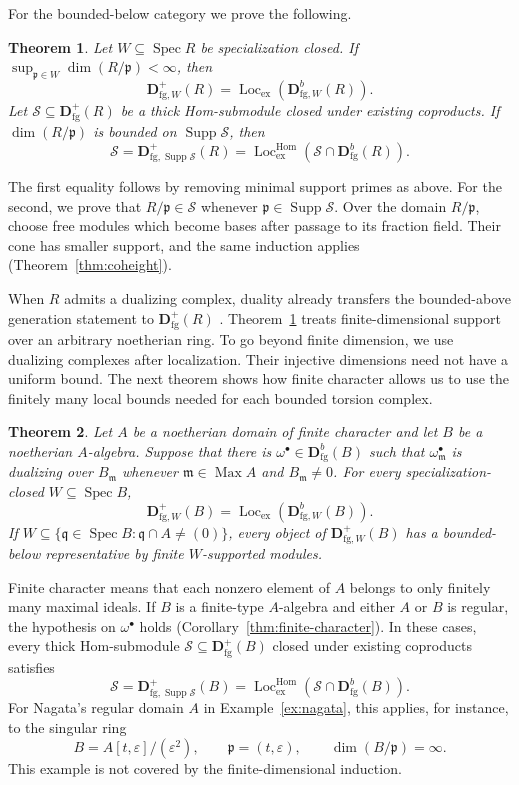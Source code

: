 \documentclass[11pt]{amsart}
\numberwithin{equation}{section}
\newtheorem{maintheorem}{Theorem}
\theoremstyle{definition}
\theoremstyle{remark}
\DeclareMathOperator{\Supp}{Supp}
\DeclareMathOperator{\Spec}{Spec}
\DeclareMathOperator{\Max}{Max}
\DeclareMathOperator{\Loc}{Loc}
\DeclareMathOperator{\Hom}{Hom}
\newcommand{\D}{\mathbf D}
\newcommand{\fg}{\mathrm{fg}}
\newcommand{\Lex}{\Loc_{\mathrm{ex}}}
\newcommand{\Lhom}{\Loc_{\mathrm{ex}}^{\Hom}}
\newcommand{\p}{\mathfrak p}
\newcommand{\q}{\mathfrak q}
\newcommand{\m}{\mathfrak m}
\begin{document}
For the bounded-below category we prove the following.

\begin{maintheorem}
\label{thm:positive-intro}
Let $W\subseteq\Spec R$ be specialization closed. If
$\sup_{\p\in W}\dim(R/\p)<\infty$, then
\[
 \D^+_{\fg,W}(R)=\Lex(\D^b_{\fg,W}(R)).
\]
Let $\mathcal S\subseteq\D^+_{\fg}(R)$ be a thick Hom-submodule closed
under existing coproducts. If
$\dim(R/\p)$ is bounded on $\Supp\mathcal S$, then
\[
 \mathcal S=\D^+_{\fg,\Supp\mathcal S}(R)
 =\Lhom(\mathcal S\cap\D^b_{\fg}(R)).
\]
\end{maintheorem}

The first equality follows by removing minimal support primes as
above. For the second, we prove that
$R/\p\in\mathcal S$ whenever $\p\in\Supp\mathcal S$.
Over the domain $R/\p$, choose free modules which become bases
after passage to its fraction field. Their cone has smaller
support, and the same induction applies
(Theorem~\ref{thm:coheight}).

When $R$ admits a dualizing complex, duality already transfers the
bounded-above generation statement to $\D^+_{\fg}(R)$
\cite[Tag~0A7C]{Stacks}. Theorem~\ref{thm:positive-intro} treats
finite-dimensional support over an arbitrary noetherian ring.
To go beyond finite dimension, we use dualizing complexes after
localization. Their injective dimensions need not have a uniform
bound. The next theorem shows how finite character allows us to
use the finitely many local bounds needed for each bounded torsion
complex.

\begin{maintheorem}\label{thm:infinite-intro}
Let $A$ be a noetherian domain of finite character and let $B$ be a
noetherian $A$-algebra. Suppose that there is
$\omega^{\bullet}\in\D^b_{\fg}(B)$ such that
$\omega^{\bullet}_{\m}$ is dualizing over $B_{\m}$ whenever
$\m\in\Max A$ and $B_{\m}\ne0$. For every specialization-closed
$W\subseteq\Spec B$,
\[
 \D^+_{\fg,W}(B)=\Lex(\D^b_{\fg,W}(B)).
\]
If $W\subseteq\{\q\in\Spec B:\q\cap A\ne(0)\}$, every object of
$\D^+_{\fg,W}(B)$ has a bounded-below representative by finite
$W$-supported modules.
\end{maintheorem}

Finite character means that each nonzero element of $A$ belongs
to only finitely many maximal ideals. If $B$ is a finite-type
$A$-algebra and either $A$ or $B$ is regular, the hypothesis on
$\omega^{\bullet}$ holds (Corollary~\ref{thm:finite-character}).
In these cases, every thick Hom-submodule
$\mathcal S\subseteq\D^+_{\fg}(B)$ closed under existing
coproducts satisfies
\[
 \mathcal S=\D^+_{\fg,\Supp\mathcal S}(B)
 =\Lhom(\mathcal S\cap\D^b_{\fg}(B)).
\]
For Nagata's regular domain $A$ in Example~\ref{ex:nagata}, this
applies, for instance, to the singular ring
\[
 B=A[t,\varepsilon]/(\varepsilon^2),\qquad
 \p=(t,\varepsilon),\qquad \dim(B/\p)=\infty.
\]
This example is not covered by the finite-dimensional induction.
\end{document}
